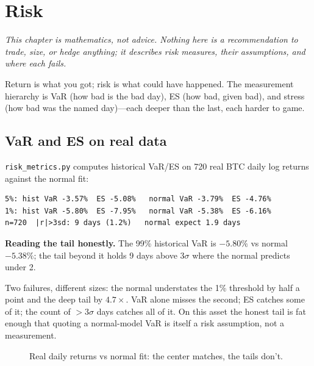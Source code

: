 \chapter{Risk}\label{ch:risk}

\noindent\emph{This chapter is mathematics, not advice. Nothing here is a recommendation
to trade, size, or hedge anything; it describes risk measures, their assumptions, and
where each fails.}

\vspace{1em}
\noindent Return is what you got; risk is what could have happened. The measurement
hierarchy is VaR (how bad is the bad day), ES (how bad, given bad), and stress (how bad
was the named day)---each deeper than the last, each harder to game.

\section{VaR and ES on real data}\label{sec:var}

\texttt{risk\_metrics.py} computes historical VaR/ES on 720 real BTC daily log returns
against the normal fit:
\begin{lstlisting}[numbers=none]
5%: hist VaR -3.57%  ES -5.08%   normal VaR -3.79%  ES -4.76%
1%: hist VaR -5.80%  ES -7.95%   normal VaR -5.38%  ES -6.16%
n=720  |r|>3sd: 9 days (1.2%)   normal expect 1.9 days
\end{lstlisting}

\begin{example}\label{ex:var}
\textbf{Reading the tail honestly.} The 99\% historical VaR is $-5.80\%$ vs normal
$-5.38\%$; the tail beyond it holds 9 days above $3\sigma$ where the normal predicts
under 2.
\begin{solution}
Two failures, different sizes: the normal understates the 1\% threshold by half a point
and the deep tail by $4.7\times$. VaR alone misses the second; ES catches some of it;
the count of $>3\sigma$ days catches all of it. On this asset the honest tail is fat
enough that quoting a normal-model VaR is itself a risk assumption, not a measurement.
\end{solution}
\end{example}

\begin{figure}[htbp]\centering

\caption{Real daily returns vs normal fit: the center matches, the tails don't.}
\label{fig:rhist}
\end{figure}

